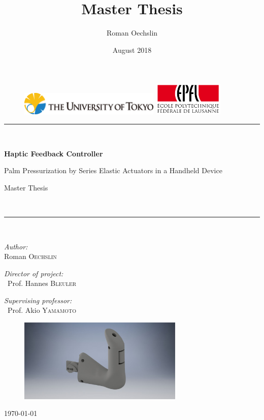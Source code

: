 \documentclass{article}
\title{Master Thesis}
\author{Roman Oechslin}
\date{August 2018}
\begin{document}
\begin{titlepage}


\begin{figure}
\includegraphics[width=0.6\textwidth]{Figs/logo_ut}
\hfill
\includegraphics[width=0.3\textwidth]{Figs/logo_epfl}
\end{figure}

\centering

\newcommand{\HRule}{\rule{\linewidth}{1.5mm}}
\HRule \\[0.4cm]
{ \huge \bfseries Haptic Feedback Controller

\Huge Palm Pressurization by Series Elastic Actuators in a Handheld Device
 
\vspace{0.5cm}

 \large Master Thesis}\\[0.4cm]
\HRule \\[1.5cm]
\begin{minipage}{0.4\textwidth}
\begin{flushleft} \large
\emph{Author:}\\
Roman \textsc{Oechslin}



\end{flushleft}
\end{minipage}
\hfill
\begin{minipage}{0.4\textwidth}
\begin{flushright} \large
\emph{Director of project:} \\
~Prof. Hannes \textsc{Bleuler}

\emph{Supervising professor:} \\
~Prof. Akio \textsc{Yamamoto}


\end{flushright}
\end{minipage}

\vfill

\begin{figure}[H]
\centering
\includegraphics[width=0.7\textwidth]{Figs/titlepage_controller.jpg}
\end{figure}

\vfill


{\large \today}

\end{titlepage}
\end{document}
